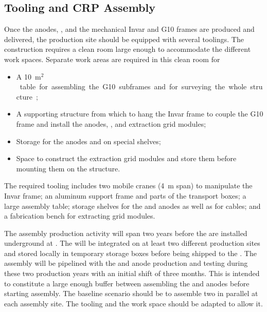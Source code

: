 \subsection{Tooling and CRP Assembly}
\label{sec:dp-crp-tooling-assy}
Once the anodes, , and the mechanical Invar and G10 frames are produced and delivered, the  production site should be equipped with several toolings.
The  construction requires a clean room large enough to accommodate the different work spaces. Separate work areas are required in this clean room for 
\begin{itemize}
\item{A \SI{10}{m$^2$} table for assembling the G10 subframes and for surveying the whole structure;}
\item{A supporting structure from which to hang the Invar frame to couple the G10 frame and install the anodes, , and extraction grid modules;}
\item{Storage for the anodes and  on special shelves;}
\item{Space to construct the extraction grid modules and store them before mounting them on the  structure.}
\end{itemize}
The required tooling includes two mobile cranes (\SI{4}{m} span) to manipulate the Invar frame; an aluminum support frame and parts of the transport boxes; a large assembly table; storage shelves for the  and anodes as well as for cables; and a fabrication bench for extracting grid modules.

The  assembly production activity will span two years 
before the  are installed underground at . The  will be integrated on at least two different production sites and stored locally in temporary storage boxes before being shipped to the . %
The  assembly will be pipelined with the  and anode production and testing during these two production years with an initial  shift of three months. This is intended to constitute a large enough buffer between assembling the  and anodes before starting  assembly. The baseline scenario should be to assemble two  in parallel at each assembly site. The tooling and the work space should be adapted to allow it.

